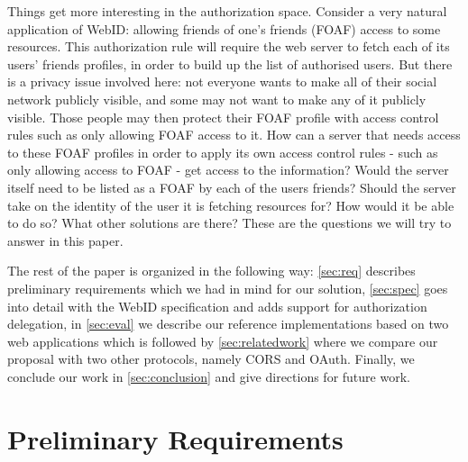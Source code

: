\documentclass[a4paper]{llncs}
\begin{document}
Things get more interesting in the authorization space.
Consider a very natural application of WebID: allowing friends of one's friends (FOAF) access to some resources.
This authorization rule will require the web server to fetch each of its users' friends profiles, in order to build up the list of authorised users.
But there is a privacy issue involved here: not everyone wants to make all of their social network publicly visible, and some may not want to make any of it publicly visible.
Those people may then protect their FOAF profile with access control rules such as only allowing FOAF access to it.
How can a server that needs access to these FOAF profiles in order to apply its own access control rules - such as only allowing access to FOAF - get access to the information? 
Would the server itself need to be listed as a FOAF by each of the users friends?
Should the server take on the identity of the user it is fetching resources for? 
How would it be able to do so?
What other solutions are there?
These are the questions we will try to answer in this paper.

The rest of the paper is organized in the following way:
\autoref{sec:req} describes preliminary requirements which we had in mind for our solution,
\autoref{sec:spec} goes into detail with the WebID specification and adds support for authorization delegation,
in \autoref{sec:eval} we describe our reference implementations based on two web applications which is followed by \autoref{sec:relatedwork} where we compare our proposal with two other protocols, namely CORS and OAuth.
Finally, we conclude our work in \autoref{sec:conclusion} and give directions for future work.


\section{Preliminary Requirements}\label{sec:req}

\end{document}
